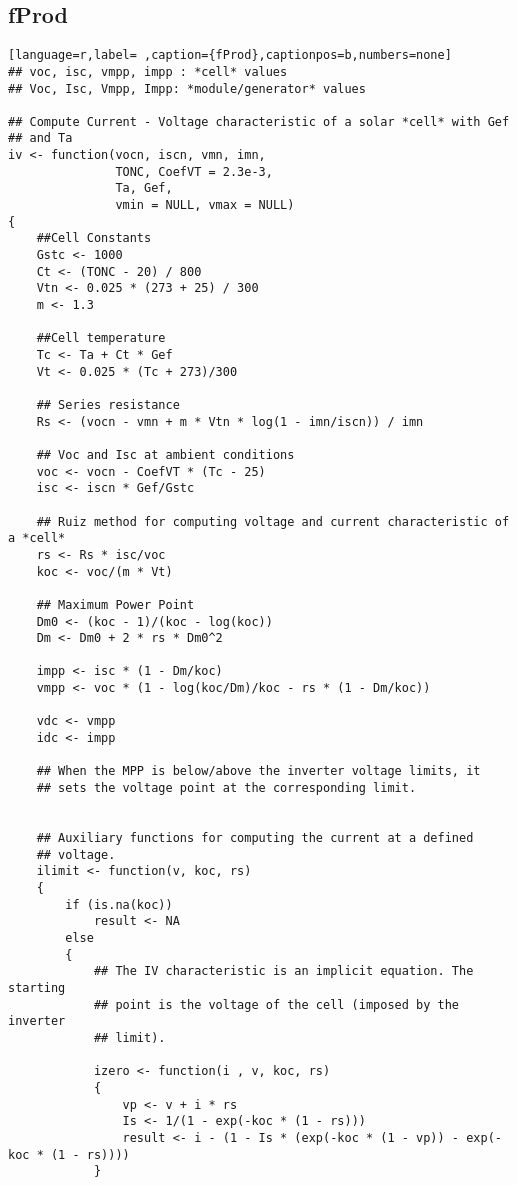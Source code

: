 \subsection{fProd}
\label{sec:orga9ac9a1}
\label{subsec:fprod}
\begin{lstlisting}[language=r,label= ,caption={fProd},captionpos=b,numbers=none]
## voc, isc, vmpp, impp : *cell* values
## Voc, Isc, Vmpp, Impp: *module/generator* values

## Compute Current - Voltage characteristic of a solar *cell* with Gef
## and Ta
iv <- function(vocn, iscn, vmn, imn,
               TONC, CoefVT = 2.3e-3,
               Ta, Gef,
               vmin = NULL, vmax = NULL)
{
    ##Cell Constants
    Gstc <- 1000
    Ct <- (TONC - 20) / 800
    Vtn <- 0.025 * (273 + 25) / 300
    m <- 1.3

    ##Cell temperature
    Tc <- Ta + Ct * Gef
    Vt <- 0.025 * (Tc + 273)/300

    ## Series resistance
    Rs <- (vocn - vmn + m * Vtn * log(1 - imn/iscn)) / imn

    ## Voc and Isc at ambient conditions
    voc <- vocn - CoefVT * (Tc - 25)
    isc <- iscn * Gef/Gstc

    ## Ruiz method for computing voltage and current characteristic of a *cell*
    rs <- Rs * isc/voc
    koc <- voc/(m * Vt)

    ## Maximum Power Point
    Dm0 <- (koc - 1)/(koc - log(koc))
    Dm <- Dm0 + 2 * rs * Dm0^2

    impp <- isc * (1 - Dm/koc)
    vmpp <- voc * (1 - log(koc/Dm)/koc - rs * (1 - Dm/koc))

    vdc <- vmpp
    idc <- impp

    ## When the MPP is below/above the inverter voltage limits, it
    ## sets the voltage point at the corresponding limit.


    ## Auxiliary functions for computing the current at a defined
    ## voltage.
    ilimit <- function(v, koc, rs) 
    {
        if (is.na(koc)) 
            result <- NA
        else
        {
            ## The IV characteristic is an implicit equation. The starting
            ## point is the voltage of the cell (imposed by the inverter
            ## limit). 

            izero <- function(i , v, koc, rs)
            {
                vp <- v + i * rs
                Is <- 1/(1 - exp(-koc * (1 - rs)))
                result <- i - (1 - Is * (exp(-koc * (1 - vp)) - exp(-koc * (1 - rs))))
            }


\end{lstlisting}
